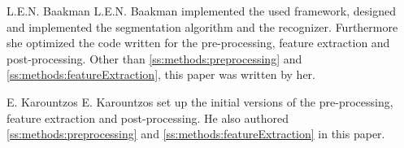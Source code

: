\begin{IEEEbiographynophoto}{L.E.N. Baakman}
L.E.N. Baakman implemented the used framework, designed and implemented the segmentation algorithm and the recognizer. Furthermore she optimized the code written for the pre-processing, feature extraction and post-processing. Other than \cref{ss:methods:preprocessing} and \ref{ss:methods:featureExtraction}, this paper was written by her. 
\end{IEEEbiographynophoto}

\begin{IEEEbiographynophoto}{E. Karountzos}
E. Karountzos set up the initial versions of the pre-processing, feature extraction and post-processing. He also authored \cref{ss:methods:preprocessing} and \ref{ss:methods:featureExtraction} in this paper.
\end{IEEEbiographynophoto}